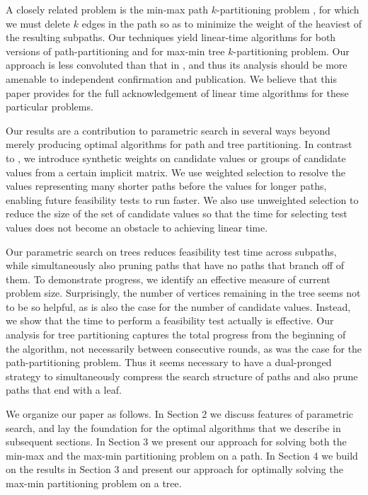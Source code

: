 A closely related problem is the min-max path $k$-partitioning problem \cite{BPS},  for which we must delete $k$ edges in the path so as to minimize the weight of the heaviest of the resulting subpaths. 
Our techniques yield linear-time algorithms for both versions of path-partitioning  and for max-min tree $k$-partitioning problem. Our approach is less convoluted than that in \cite{FTR, F1}, and thus its analysis should be more amenable to independent confirmation and publication. 
We believe that this paper provides for the full acknowledgement of linear time  algorithms for these particular problems.

Our results are a contribution to parametric search in several ways
beyond merely producing optimal algorithms for path and tree partitioning.  
In contrast to \cite{F1}, we introduce synthetic weights on candidate values 
or groups of candidate values from a certain implicit matrix. 
We use weighted selection to resolve the values representing many shorter paths before the values for longer paths, enabling future feasibility tests to run faster. 
We also use unweighted selection to reduce the size of the set of candidate values so that the time for selecting 
test values does not become an obstacle to achieving linear time. 

Our parametric search on trees reduces feasibility test time across subpaths, while simultaneously also pruning paths that
have no paths that branch off of them. To demonstrate progress, we identify an effective measure of current problem size. 
Surprisingly, the number of vertices remaining in the tree seems not to be so helpful, as is also the case for the number of candidate values. 
Instead, we show that the time to perform a feasibility test actually is effective. 
Our analysis for tree partitioning captures the total progress from the beginning of the algorithm, not necessarily between consecutive rounds, as was the case for the path-partitioning problem. 
Thus it seems necessary to have a dual-pronged strategy to simultaneously compress the search structure of paths and also prune paths that end with a leaf.

We organize our paper as follows. 
In Section 2 we discuss features of parametric search, and lay the foundation for the optimal algorithms that we describe in subsequent sections.
In Section 3 we present our approach for solving both
the min-max and the max-min partitioning problem on a path. 
In Section 4 we build on the results in Section 3 and
present our approach for optimally solving the max-min partitioning problem on a tree.
\bigskip

